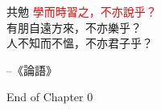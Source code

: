 \documentclass{beamer}
\begin{document}
\begin{frame}{共勉}
\normalsize{\textcolor{red}{學而時習之，不亦說乎？}} \\
\vspace{1em}
\normalsize{有朋自遠方來，不亦樂乎？} \\
\vspace{1em}
\normalsize{人不知而不慍，不亦君子乎？} \\
\vspace{1em}
\begin{flushright}
--《論語》
\end{flushright}
\end{frame}
\begin{frame}{}
\begin{center}
\Large{End of Chapter 0}
\end{center}
\end{frame}
\end{document}
